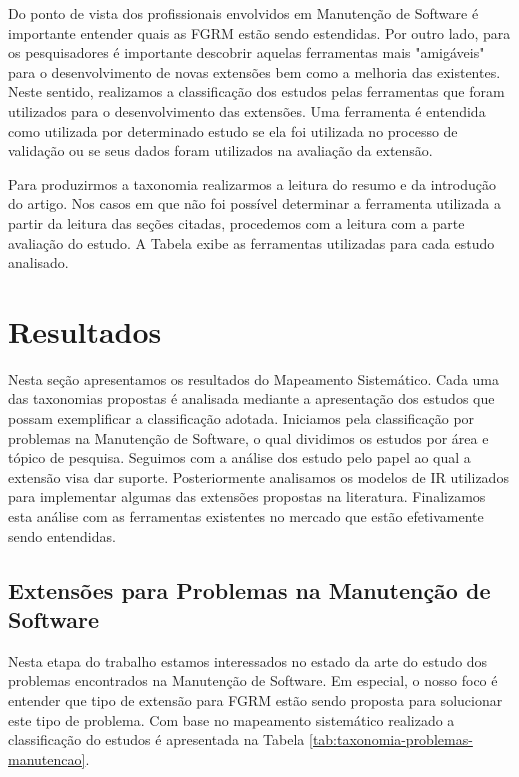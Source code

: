 Do ponto de vista dos profissionais envolvidos em Manutenção de Software é importante entender quais as FGRM estão sendo estendidas. Por outro lado, para os pesquisadores é importante descobrir aquelas ferramentas mais "amigáveis" para o desenvolvimento de novas extensões bem como a melhoria das existentes. Neste sentido, realizamos a classificação dos estudos pelas ferramentas que foram utilizados para o desenvolvimento das extensões. Uma ferramenta é entendida como utilizada por determinado estudo se ela foi utilizada no processo de validação ou se seus dados foram utilizados na avaliação da extensão. 

Para produzirmos a taxonomia realizarmos a leitura do resumo e da introdução do artigo. Nos casos em que não foi possível determinar a ferramenta utilizada a partir da leitura das seções citadas, procedemos com a leitura com a parte avaliação do estudo. A Tabela exibe as ferramentas utilizadas para cada estudo analisado.


\section{Resultados}
\label{sec:resutaldos}

Nesta seção apresentamos os resultados do Mapeamento Sistemático. Cada uma das taxonomias propostas
é analisada mediante a apresentação dos estudos que possam exemplificar a classificação adotada.
Iniciamos pela classificação por problemas na Manutenção de Software, o qual dividimos os estudos
por área e tópico de pesquisa. Seguimos com a análise dos estudo pelo papel ao qual a extensão visa
dar suporte. Posteriormente analisamos os modelos de IR utilizados para implementar algumas das
extensões propostas na literatura. Finalizamos esta análise com as ferramentas existentes no mercado
que estão efetivamente sendo entendidas.

\subsection{Extensões para Problemas na Manutenção de Software}
\label{sub:extensões_para_problemas_na_manutenção_de_software}

Nesta etapa do trabalho estamos interessados no estado da arte do estudo dos problemas encontrados
na Manutenção de Software. Em especial, o nosso foco é entender que tipo de extensão para FGRM estão
sendo proposta para solucionar este tipo de problema. Com base no mapeamento sistemático realizado a
classificação do estudos é apresentada na Tabela \ref{tab:taxonomia-problemas-manutencao}.


